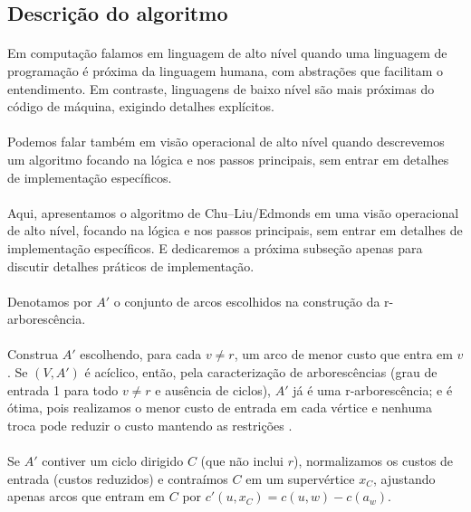 \documentclass[12pt,a4paper]{article}
\def\emph#1{#1}%
\begin{document}
\subsection{Descrição do algoritmo}

\paragraph{}
Em computação falamos em linguagem de alto nível quando uma linguagem de programação é próxima da linguagem humana, com abstrações que facilitam o entendimento. Em contraste, linguagens de baixo nível são mais próximas do código de máquina, exigindo detalhes explícitos. 

\paragraph{}
Podemos falar também em visão operacional de alto nível quando descrevemos um algoritmo focando na lógica e nos passos principais, sem entrar em detalhes de implementação específicos.

\paragraph{}
Aqui, apresentamos o algoritmo de Chu–Liu/Edmonds em uma visão operacional de alto nível, focando na lógica e nos passos principais, sem entrar em detalhes de implementação específicos. E dedicaremos a próxima subseção apenas para discutir detalhes práticos de implementação.

\paragraph{}
Denotamos por \(A'\) o conjunto de arcos escolhidos na construção da r-arborescência. 

\paragraph{}
Construa \(A'\) escolhendo, para cada \(v\neq r\), um arco de menor custo que \emph{entra} em \(v\). Se \((V,A')\) é acíclico, então, pela caracterização de arborescências (grau de entrada 1 para todo \(v\neq r\) e ausência de ciclos), \(A'\) já é uma r‑arborescência; e é \emph{ótima}, pois realizamos o menor custo de entrada em cada vértice e nenhuma troca pode reduzir o custo mantendo as restrições \cite[Sec.~4.9]{kleinberg2006}. 

\paragraph{}
Se \(A'\) contiver um ciclo dirigido \(C\) (que não inclui \(r\)), normalizamos os custos de entrada (custos reduzidos) e \emph{contraímos} \(C\) em um supervértice \(x_C\), ajustando apenas arcos que \emph{entram} em \(C\) por \(c'(u,x_C)=c(u,w)-c(a_w)\). 
\end{document}
